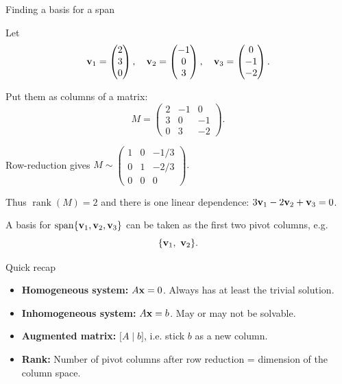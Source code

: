 \documentclass{beamer}
\DeclareMathOperator{\rank}{rank}
\begin{document}
\begin{frame}{Finding a basis for a span}

Let
\[
{\bf v}_1=\begin{pmatrix}2\\3\\0\end{pmatrix},\quad
{\bf v}_2=\begin{pmatrix}-1\\0\\3\end{pmatrix},\quad
{\bf v}_3=\begin{pmatrix}0\\-1\\-2\end{pmatrix}.
\]

Put them as columns of a matrix:
\[
M=\begin{pmatrix}
2&-1&0\\
3&0&-1\\
0&3&-2
\end{pmatrix}.
\]

Row-reduction gives
\(
M \sim
\begin{pmatrix}
1&0&-1/3\\
0&1&-2/3\\
0&0&0
\end{pmatrix}.
\)

Thus $\rank(M)=2$ and there is one linear dependence:  
$3{\bf v}_1-2{\bf v}_2+{\bf v}_3=0$.  

A basis for $\mathrm{span}\{{\bf v}_1,{\bf v}_2,{\bf v}_3\}$ can be taken as the first two pivot columns, e.g.
\[
\{{\bf v}_1,\ {\bf v}_2\}.
\]

\end{frame}


\begin{frame}{Quick recap}
\begin{itemize}
\item \textbf{Homogeneous system:} $A{\bf x}=0$. Always has at least the trivial solution.
\item \textbf{Inhomogeneous system:} $A{\bf x}=b$. May or may not be solvable.
\item \textbf{Augmented matrix:} $\big[A \mid b\big]$, i.e. stick $b$ as a new column.
\item \textbf{Rank:} Number of pivot columns after row reduction = dimension of the column space.
\end{itemize}
\end{frame}
\end{document}
